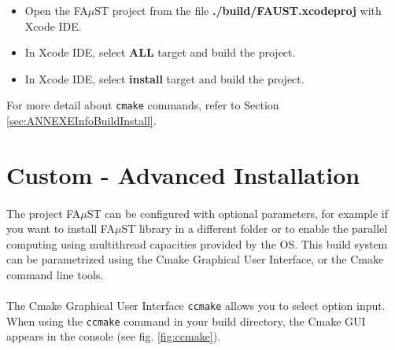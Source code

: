 \begin{itemize}
\begin{itemize}
\item Open the FA$\mu$ST project from the file \textbf{./build/FAUST.xcodeproj} with Xcode IDE. 
\item In Xcode IDE, select \textbf{ALL} target and build the project. 
\item In Xcode IDE, select \textbf{install} target and build the project. 
\end{itemize}

For more detail about \texttt{cmake} commands, refer to Section \ref{sec:ANNEXEInfoBuildInstall}.



\section{Custom - Advanced Installation}\label{sec:UnixCustomInstall}

\paragraph{}The project FA$\mu$ST can be configured with optional parameters, for example if you want to install FA$\mu$ST library in a different folder or to enable the parallel computing using multithread capacities provided by the OS. This build system can be parametrized using the Cmake Graphical User Interface, or the Cmake command line tools. 

\paragraph{}The Cmake Graphical User Interface \texttt{ccmake} allows you to select option input. When using the \texttt{ccmake} command in your build directory, the Cmake GUI appears in the console (see fig. \ref{fig:ccmake}).


\end{itemize}
